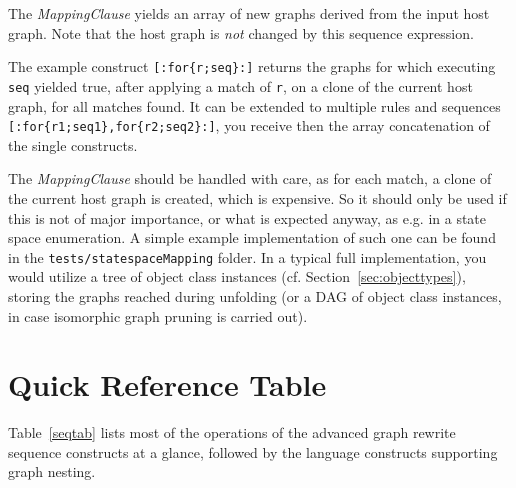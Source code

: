The \emph{MappingClause} yields an array of new graphs derived from the input host graph.
Note that the host graph is \emph{not} changed by this sequence expression.

The example construct \verb#[:for{r;seq}:]# returns the graphs for which executing \texttt{seq} yielded true, after applying a match of \texttt{r}, on a clone of the current host graph, for all matches found.
It can be extended to multiple rules and sequences \verb#[:for{r1;seq1},for{r2;seq2}:]#, you receive then the array concatenation of the single constructs.

The \emph{MappingClause} should be handled with care, as for each match, a clone of the current host graph is created, which is expensive.
So it should only be used if this is not of major importance, or what is expected anyway, as e.g. in a state space enumeration.
A simple example implementation of such one can be found in the \texttt{tests/statespaceMapping} folder.
In a typical full implementation, you would utilize a tree of object class instances (cf. Section~\ref{sec:objecttypes}), storing the graphs reached during unfolding (or a DAG of object class instances, in case isomorphic graph pruning is carried out).


\section{Quick Reference Table}

Table~\ref{seqtab} lists most of the operations of the advanced graph rewrite sequence constructs at a glance, followed by the language constructs supporting graph nesting.

